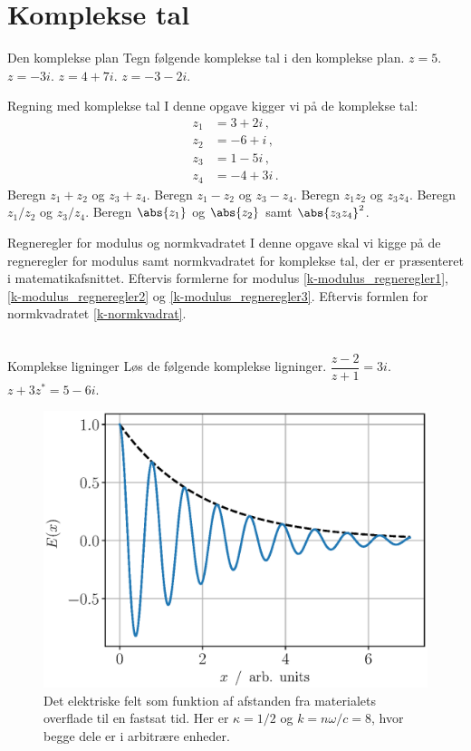 \section*{Komplekse tal}
\begin{opgave}[1]{Den komplekse plan}
Tegn følgende komplekse tal i den komplekse plan.
\opg $z = 5$.
\opg $z = -3i$.
\opg $z = 4 + 7i$.
\opg $z = -3 - 2i$.
\end{opgave}
\begin{opgave}[1]{Regning med komplekse tal}
I denne opgave kigger vi på de komplekse tal:
\begin{align*}
z_1 &= 3 + 2i \, , \\
z_2 &= -6+i \, , \\ 
z_3 &= 1 - 5i \, , \\
z_4 &= -4 + 3i \, .
\end{align*}
\opg Beregn $z_1+z_2$ og $z_3+z_4$.
\opg Beregn $z_1-z_2$ og $z_3-z_4$.
\opg Beregn $z_1z_2$ og $z_3z_4$.
\opg Beregn $z_1/z_2$ og $z_3/z_4$.
\opg Beregn $\abs{z_1}$ og $\abs{z_2}$ samt $\abs{z_3 z_4}^2$. 
\end{opgave}
\begin{opgave}[2]{Regneregler for modulus og normkvadratet}
I denne opgave skal vi kigge på de regneregler for modulus samt normkvadratet for komplekse tal, der er  præsenteret i matematikafsnittet.
\opg Eftervis formlerne for modulus \eqref{k-modulus_regneregler1}, \eqref{k-modulus_regneregler2} og \eqref{k-modulus_regneregler3}.
\opg Eftervis formlen for normkvadratet \eqref{k-normkvadrat}.\\ \\  
\end{opgave}
\begin{opgave}[2]{Komplekse ligninger}
Løs de følgende komplekse ligninger.
\opg $\dfrac{z-2}{z+1} = 3i$.
\opg $z+3z^* = 5-6i$.
\end{opgave}
\begin{figure}
    \centering
    \includegraphics[width=.6\columnwidth]{Matematik/matfig/e-felt.eps}
    \caption{Det elektriske felt som funktion af afstanden fra materialets overflade til en fastsat tid. Her er $\kappa = 1/2$ og $k=n\omega/c=8$, hvor begge dele er i arbitrære enheder.}
    \label{mat:fig:e-felt}
\end{figure}
